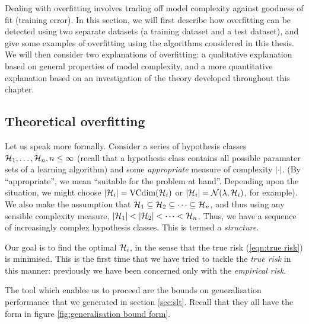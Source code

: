 Dealing with overfitting involves trading off model complexity against
goodness of fit (training error).  In this section, we will first
describe how overfitting can be detected using two separate datasets
(a training dataset and a test dataset), and give some examples of
overfitting using the algorithms considered in this thesis.  We will
then consider two explanations of overfitting: a qualitative
explanation based on general properties of model complexity, and a
more quantitative explanation based on an investigation of the theory
developed throughout this chapter.


\subsection{Theoretical overfitting}
\label{sec:theoretical overfitting}

Let us speak more formally.  Consider a series of hypothesis
classes $\mathcal{H}_1, \ldots, \mathcal{H}_n, n \leq \infty$ (recall that a
hypothesis class contains all possible paramater sets of a learning
algorithm) and some \emph{appropriate} measure of complexity
$|\cdot|$.  (By ``appropriate'', we mean ``suitable for the problem at
hand''. Depending upon the situation, we might choose $|\mathcal{H}_i| =
\mathrm{VCdim}(\mathcal{H}_i)$ or $|\mathcal{H}_i| = \mathcal{N}({\lambda}, {\mathcal{H}_i})$, for
example).  We also make the assumption that $\mathcal{H}_1 \subseteq \mathcal{H}_2
\subseteq \cdots \subseteq \mathcal{H}_n$, and thus using any sensible
complexity measure, $|\mathcal{H}_1| < |\mathcal{H}_2| < \cdots < \mathcal{H}_n$.  Thus,
we have a sequence of increasingly complex hypothesis classes.  This
is termed a \emph{structure}.

Our goal is to find the optimal $\mathcal{H}_i$, in the sense that the
true risk (\ref{eqn:true risk}) is minimised.  This is the
first time that we have tried to tackle the \emph{true risk} in this manner:
previously we have been concerned only with the \emph{empirical risk}.

The tool which enables us to proceed are the bounds on generalisation
performance that we generated in section \ref{sec:slt}.  Recall that
they all have the form in figure \ref{fig:generalisation bound form}.

